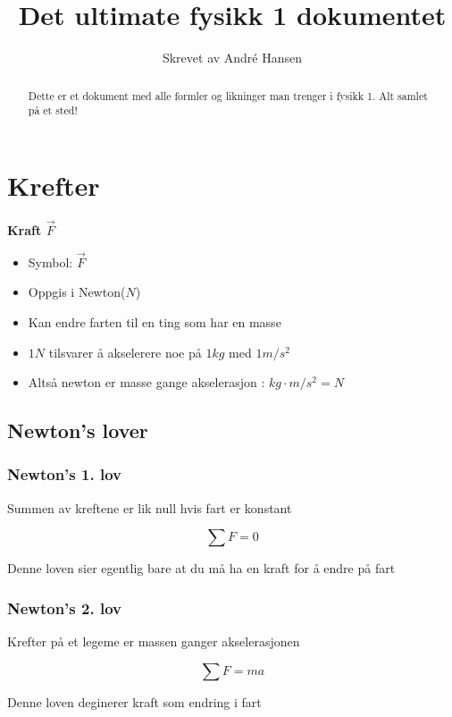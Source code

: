 \documentclass{article}
\title{Det ultimate fysikk 1 dokumentet}
\author{Skrevet av André Hansen}
\begin{document}
\maketitle

\tableofcontents

\begin{abstract}
    Dette er et dokument med alle formler og likninger man trenger i fysikk 1. 
    Alt samlet på et sted!
\end{abstract}

\section{Krefter}

\textbf{Kraft $\vec{F}$}

\begin{itemize}
    \item Symbol: $\vec{F}$
    \item Oppgis i Newton($N$)
    \item Kan endre farten til en ting som har en masse
    \item $1N$ tilsvarer å akselerere noe på $1kg$ med $1m/s^2$
    \item Altså newton er masse gange akselerasjon : $kg \cdot m/s^2 = N$
\end{itemize}

\subsection{Newton's lover}

\subsubsection{Newton's 1. lov}

Summen av kreftene er lik null hvis fart er konstant

$$\sum F = 0$$

Denne loven sier egentlig bare at du må ha en kraft for å endre på fart

\subsubsection{Newton's 2. lov}

Krefter på et legeme er massen ganger akselerasjonen

$$\sum F = ma$$

Denne loven deginerer kraft som endring i fart
\end{document}
